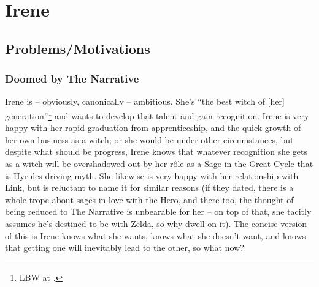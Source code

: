 \section{Irene} 
  \subsection{Problems/Motivations}
  \subsubsection{Doomed by The Narrative}\label{sec:DoomedByTheNarrative}
  Irene is -- obviously, canonically -- ambitious. She's ``the best witch of [her] generation''\footnote{\label{note:lbw}\textsc{LBW} at .} and wants to develop that talent and gain recognition. Irene is very happy with her rapid graduation from apprenticeship, and the quick growth of her own business as a witch; or she would be under other circumstances, but despite what should be progress, Irene knows that whatever recognition she gets as a witch will be overshadowed out by her r\^ole as a Sage in the Great Cycle that is Hyrules driving myth. She likewise is very happy with her relationship with Link, but is reluctant to name it for similar reasons (if they dated, there is a whole trope about sages in love with the Hero, and there too, the thought of being reduced to The Narrative is unbearable for her -- on top of that, she tacitly assumes he's destined to be with Zelda, so why dwell on it). The concise version of this is Irene knows what she wants, knows what she doesn't want, and knows that getting one will inevitably lead to the other, so what now?
  
